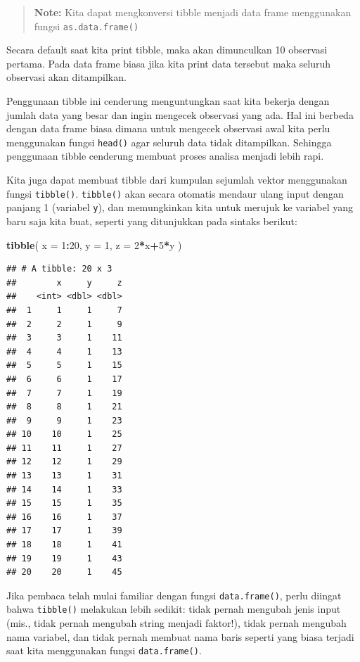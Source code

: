 \documentclass[]{book}
\newenvironment{Shaded}{\begin{snugshade}}{\end{snugshade}}
\newcommand{\KeywordTok}[1]{\textcolor[rgb]{0.13,0.29,0.53}{\textbf{#1}}}
\newcommand{\DataTypeTok}[1]{\textcolor[rgb]{0.13,0.29,0.53}{#1}}
\newcommand{\DecValTok}[1]{\textcolor[rgb]{0.00,0.00,0.81}{#1}}
\newcommand{\OperatorTok}[1]{\textcolor[rgb]{0.81,0.36,0.00}{\textbf{#1}}}
\newcommand{\NormalTok}[1]{#1}
\begin{document}
\begin{quote}
\textbf{Note: } Kita dapat mengkonversi tibble menjadi data frame
menggunakan fungsi \texttt{as.data.frame()}
\end{quote}

Secara default saat kita print tibble, maka akan dimunculkan 10
observasi pertama. Pada data frame biasa jika kita print data tersebut
maka seluruh observasi akan ditampilkan.

Penggunaan tibble ini cenderung menguntungkan saat kita bekerja dengan
jumlah data yang besar dan ingin mengecek observasi yang ada. Hal ini
berbeda dengan data frame biasa dimana untuk mengecek observasi awal
kita perlu menggunakan fungsi \texttt{head()} agar seluruh data tidak
ditampilkan. Sehingga penggunaan tibble cenderung membuat proses analisa
menjadi lebih rapi.

Kita juga dapat membuat tibble dari kumpulan sejumlah vektor menggunakan
fungsi \texttt{tibble()}. \texttt{tibble()} akan secara otomatis mendaur
ulang input dengan panjang 1 (variabel \texttt{y}), dan memungkinkan
kita untuk merujuk ke variabel yang baru saja kita buat, seperti yang
ditunjukkan pada sintaks berikut:

\begin{Shaded}
\begin{Highlighting}[]
\KeywordTok{tibble}\NormalTok{(}
  \DataTypeTok{x =} \DecValTok{1}\OperatorTok{:}\DecValTok{20}\NormalTok{,}
  \DataTypeTok{y =} \DecValTok{1}\NormalTok{,}
  \DataTypeTok{z =} \DecValTok{2}\OperatorTok{*}\NormalTok{x}\OperatorTok{+}\DecValTok{5}\OperatorTok{*}\NormalTok{y}
\NormalTok{)}
\end{Highlighting}
\end{Shaded}

\begin{verbatim}
## # A tibble: 20 x 3
##        x     y     z
##    <int> <dbl> <dbl>
##  1     1     1     7
##  2     2     1     9
##  3     3     1    11
##  4     4     1    13
##  5     5     1    15
##  6     6     1    17
##  7     7     1    19
##  8     8     1    21
##  9     9     1    23
## 10    10     1    25
## 11    11     1    27
## 12    12     1    29
## 13    13     1    31
## 14    14     1    33
## 15    15     1    35
## 16    16     1    37
## 17    17     1    39
## 18    18     1    41
## 19    19     1    43
## 20    20     1    45
\end{verbatim}

Jika pembaca telah mulai familiar dengan fungsi \texttt{data.frame()},
perlu diingat bahwa \texttt{tibble()} melakukan lebih sedikit: tidak
pernah mengubah jenis input (mis., tidak pernah mengubah string menjadi
faktor!), tidak pernah mengubah nama variabel, dan tidak pernah membuat
nama baris seperti yang biasa terjadi saat kita menggunakan fungsi
\texttt{data.frame()}.
\end{document}
